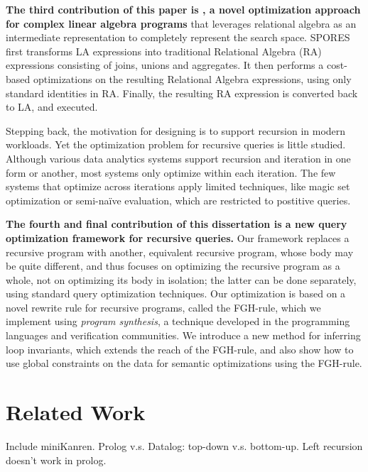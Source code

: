 \textbf{The third contribution of this paper is \sys, a novel optimization approach for
complex linear algebra programs} that leverages relational algebra as
an intermediate representation to completely represent the search
space.
SPORES first transforms LA expressions into traditional
Relational Algebra (RA) expressions consisting of joins, unions 
and aggregates.  It then performs a cost-based optimizations on
the resulting Relational Algebra expressions, using only standard
identities in RA.  Finally, the resulting RA expression is converted
back to LA, and executed.

Stepping back, the motivation for designing \datalogo 
 is to support recursion in modern workloads.
Yet the optimization problem for recursive queries is little studied.
Although various data analytics systems support recursion and iteration
 in one form or another, 
 most systems only optimize within each iteration.
The few systems that optimize across iterations
 apply limited techniques, like magic set optimization
 or semi-na\"ive evaluation,
 which are restricted to postitive queries.


\textbf{The fourth and final contribution of this dissertation is a new query optimization framework for
recursive queries.}
Our framework replaces a recursive program with
another, equivalent recursive program, whose body may be quite
different, and thus focuses on optimizing the recursive program as a
whole, not on optimizing its body in isolation; the latter can be done
separately, using standard query optimization techniques.  Our
optimization is based on a novel rewrite rule for recursive programs,
called the FGH-rule, which we implement using {\em program synthesis},
a technique developed in the programming languages and verification
communities. We introduce a new method for inferring loop invariants,
which extends the reach of the FGH-rule, and also show how to use
global constraints on the data for semantic optimizations using the
FGH-rule.  

\section{Related Work}
\label{sec:intro:related-work}

Include miniKanren. Prolog v.s. Datalog: top-down v.s.
bottom-up. Left recursion doesn't work in prolog. 